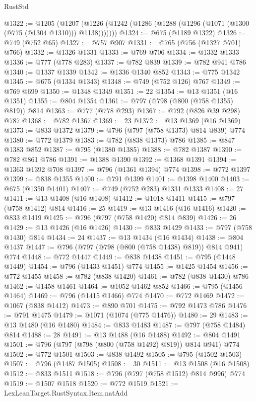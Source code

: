 \begin{lexlean}{RustStd}
\begin{coremodule}
@1322 := @1205
    (@1207 (@1226 (@1242 (@1286 (@1288 (@1296 (@1071 (@1300 (@775 (@1304 @1310))) @1138)))))))
@1324 := @675 (@1189 @1322)
@1326 := @749 (@752 @65)
@1327 := @757 @907
@1331 := @765 (@756 (@1327 @701) @766)
@1332 := @1326 @1331
@1333 := @769 @706
@1334 := @1332 @1333
@1336 := @777 (@778 @283)
@1337 := @782 @839
@1339 := @782 @941 @786
@1340 := @1337 @1339
@1342 := @1336 @1340 @852
@1343 := @775 @1342
@1345 := @675 (@1334 @1343)
@1348 := @749 (@752 @126) @767
@1349 := @769 @699
@1350 := @1348 @1349
@1351 := 22
@1354 := @13 @1351 (@16 @1351)
@1355 := @804 @1354
@1361 := @797 (@798 (@800 (@758 @1355) @819)) @814
@1363 := @777 (@778 @293)
@1367 := @792 (@826 @39 @298) @787
@1368 := @782 @1367
@1369 := 23
@1372 := @13 @1369 (@16 @1369)
@1373 := @833 @1372
@1379 := @796 (@797 (@758 @1373) @814 @839) @774
@1380 := @772 @1379
@1383 := @782 (@838 @1373) @786
@1385 := @847 @1383 @852
@1387 := @795 (@1380 @1385)
@1388 := @782 @1387
@1390 := @782 @861 @786
@1391 := @1388 @1390
@1392 := @1368 @1391
@1394 := @1363 @1392 @708
@1397 := @796 (@1361 @1394) @774
@1398 := @772 @1397
@1399 := @838 @1355
@1400 := @791 @1399
@1401 := @1398 @1400
@1403 := @675 (@1350 @1401)
@1407 := @749 (@752 @283) @1331 @1333
@1408 := 27
@1411 := @13 @1408 (@16 @1408)
@1412 := @1018 @1411
@1415 := @797 (@758 @1412) @814
@1416 := 25
@1419 := @13 @1416 (@16 @1416)
@1420 := @833 @1419
@1425 := @796 (@797 (@758 @1420) @814 @839)
@1426 := 26
@1429 := @13 @1426 (@16 @1426)
@1430 := @833 @1429
@1433 := @797 (@758 @1430) @814
@1434 := 24
@1437 := @13 @1434 (@16 @1434)
@1438 := @804 @1437
@1447 := @796 (@797 (@798 (@800 (@758 @1438) @819)) @814 @941) @774
@1448 := @772 @1447
@1449 := @838 @1438
@1451 := @795 (@1448 @1449)
@1454 := @796 (@1433 @1451) @774
@1455 := @1425 @1454
@1456 := @772 @1455
@1458 := @782 (@838 @1420)
@1461 := @782 (@838 @1430) @786
@1462 := @1458 @1461
@1464 := @1052 @1462 @852
@1466 := @795 (@1456 @1464)
@1469 := @796 (@1415 @1466) @774
@1470 := @772 @1469
@1472 := @1067 (@838 @1412)
@1473 := @890 @701
@1475 := @792 @1473 @786
@1476 := @791 @1475
@1479 := @1071 (@1074 (@775 @1476))
@1480 := 29
@1483 := @13 @1480 (@16 @1480)
@1484 := @833 @1483
@1487 := @797 (@758 @1484) @814
@1488 := 28
@1491 := @13 @1488 (@16 @1488)
@1492 := @804 @1491
@1501 := @796 (@797 (@798 (@800 (@758 @1492) @819)) @814 @941) @774
@1502 := @772 @1501
@1503 := @838 @1492
@1505 := @795 (@1502 @1503)
@1507 := @796 (@1487 @1505)
@1508 := 30
@1511 := @13 @1508 (@16 @1508)
@1512 := @833 @1511
@1518 := @796 (@797 (@758 @1512) @814 @996) @774
@1519 := @1507 @1518
@1520 := @772 @1519
@1521 := LexLeanTarget.RustSyntax.Item.natAdd

\end{coremodule}
\end{lexlean}
